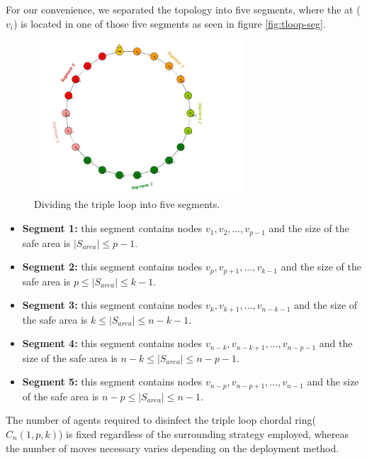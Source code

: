   



For our convenience, we separated the topology into five segments, where the  \bv at ($v_i$) is located in one of those five segments as seen in figure \ref{fig:tloop-seg}.

\begin{figure}[H]
  \centering  
  \includegraphics[width=0.7\textwidth]{figures/tloop_seg.jpg}
  \caption{Dividing the triple loop into five segments.}\label{fig:dloop-seg}
\end{figure}

\begin{itemize}

\item {\bf Segment 1:}  this segment contains nodes $v_1,v_2,...,v_{p-1}$ and the size of the safe area is $ |S_{area}| \leq p-1$.
\item {\bf Segment 2:}  this segment contains nodes $v_p,v_{p+1},...,v_{k-1}$ and the size of the safe area is $p \leq |S_{area}| \leq k-1$.
\item {\bf Segment 3:} this segment contains nodes $v_k,v_{k+1},...,v_{n-k-1}$ and the size of the safe area is $k \leq |S_{area}| \leq n-k-1$.
\item {\bf Segment 4:} this segment contains nodes $v_{n-k},v_{n-k+1},...,v_{n-p-1}$ and the size of the safe area is $n-k \leq |S_{area}| \leq n-p-1$.
\item {\bf Segment 5:}   this segment contains nodes $v_{n-p},v_{n-p+1},...,v_{n-1}$ and the size of the safe area is $n-p \leq |S_{area}| \leq n-1$.
\end{itemize}



The number of agents required to disinfect the triple loop chordal ring($C_n(1,p,k)$) is fixed regardless of  the surrounding strategy employed, whereas the number of moves necessary varies depending on the deployment method.


